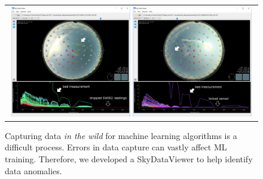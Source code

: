 \begin{figure} [hbtp]
\begin{center}
\begin{tabular}{c}
\includegraphics[width=0.485\textwidth]{img/data_badmissing.jpg}
\includegraphics[width=0.485\textwidth]{img/data_badlocked.jpg}
\end{tabular}
\end{center}
\caption[skydataviewer] { \label{fig:skydataviewer} Capturing data \textit{in the wild} for machine learning algorithms is a difficult process. Errors in data capture can vastly affect ML training. Therefore, we developed a SkyDataViewer to help identify data anomalies.}
\end{figure}

